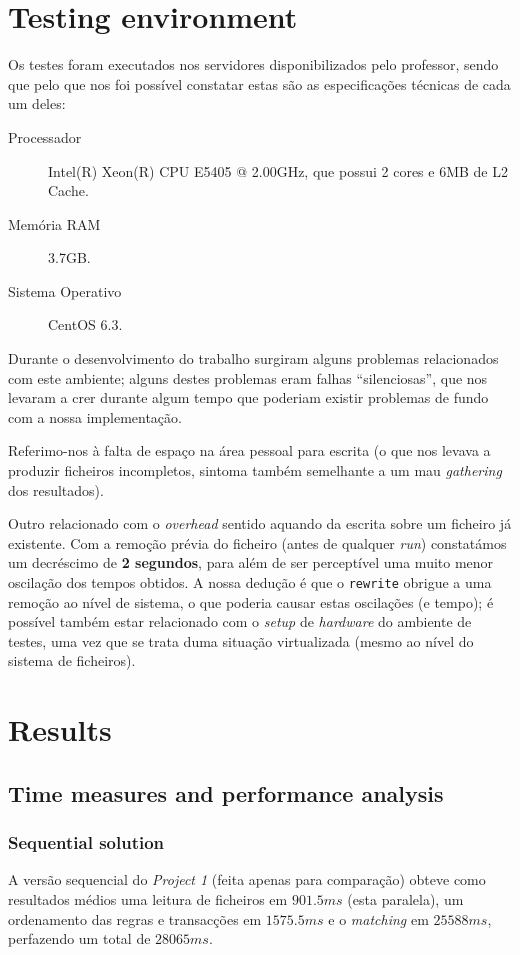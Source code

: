 \documentclass[a4paper]{article}
\begin{document}
\section{Testing environment}
\indent \indent Os testes foram executados nos servidores disponibilizados pelo professor, sendo que pelo que nos foi possível constatar estas são as especificações técnicas de cada um deles:
\begin{description}
	\item [Processador] Intel(R) Xeon(R) CPU E5405 @ 2.00GHz, que possui 2 cores e 6MB de L2 Cache.
	\item [Memória RAM] 3.7GB.
	\item [Sistema Operativo] CentOS 6.3.
\end{description}

Durante o desenvolvimento do trabalho surgiram alguns problemas relacionados com este ambiente; alguns destes problemas eram falhas ``silenciosas'', que nos levaram a crer durante algum tempo que poderiam existir problemas de fundo com a nossa implementação.

Referimo-nos à falta de espaço na área pessoal para escrita (o que nos levava a produzir ficheiros incompletos, sintoma também semelhante a um mau \textit{gathering} dos resultados).

Outro relacionado com o \textit{overhead} sentido aquando da escrita sobre um ficheiro já existente. Com a remoção prévia do ficheiro (antes de qualquer \textit{run}) constatámos um decréscimo de \textbf{2 segundos}, para além de ser perceptível uma muito menor oscilação dos tempos obtidos. A nossa dedução é que o \texttt{rewrite} obrigue a uma remoção ao nível de sistema, o que poderia causar estas oscilações (e tempo); é possível também estar relacionado com o \textit{setup} de \textit{hardware} do ambiente de testes, uma vez que se trata duma situação virtualizada (mesmo ao nível do sistema de ficheiros).
\clearpage

\section{Results}
\subsection{Time measures and performance analysis}
\subsubsection{Sequential solution}
\indent \indent A versão sequencial do \textit{Project 1} (feita apenas para comparação) obteve como resultados médios uma leitura de ficheiros em $901.5ms$ (esta paralela), um ordenamento das regras e transacções em $1575.5ms$ e o \textit{matching} em $25588ms$, perfazendo um total de $28065ms$.
\end{document}

